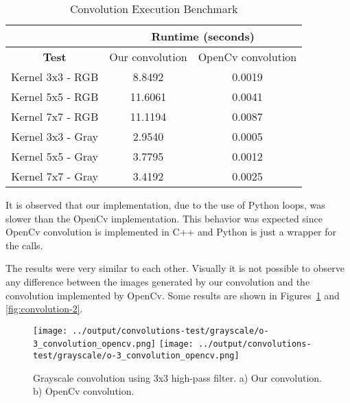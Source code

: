 \documentclass[]{IEEEtran}
\begin{document}
\begin{table}[h!]
\begin{tabular}{|c|c|c|}
\hline
\textbf{}         & \multicolumn{2}{c|}{\textbf{Runtime (seconds)}}                                \\ \hline
\textbf{Test}     & \multicolumn{1}{l|}{Our convolution} & \multicolumn{1}{l|}{OpenCv convolution} \\ \hline
Kernel 3x3 - RGB  & 8.8492                               & 0.0019                                  \\ \hline
Kernel 5x5 - RGB  & 11.6061                              & 0.0041                                  \\ \hline
Kernel 7x7 - RGB  & 11.1194                              & 0.0087                                  \\ \hline
Kernel 3x3 - Gray & 2.9540                               & 0.0005                                  \\ \hline
Kernel 5x5 - Gray & 3.7795                               & 0.0012                                  \\ \hline
Kernel 7x7 - Gray & 3.4192                               & 0.0025                                  \\ \hline
\end{tabular}
\caption{Convolution Execution Benchmark}
\label{table-convolution}
\end{table}

It is observed that our implementation, due to the use of Python loops, was slower than the OpenCv implementation. This behavior was expected since OpenCv convolution is implemented in C++ and Python is just a wrapper for the calls.

The results were very similar to each other. Visually it is not possible to observe any difference between the images generated by our convolution and the convolution implemented by OpenCv. Some results are shown in Figures~\ref{fig:convolution-1} and \ref{fig:convolution-2}.

\begin{figure}[H]
    \centering
    \texttt{[image: ../output/convolutions-test/grayscale/o-3\_convolution\_opencv.png]}
    \texttt{[image: ../output/convolutions-test/grayscale/o-3\_convolution\_opencv.png]}
    \caption{Grayscale convolution using 3x3 high-pass filter. a) Our convolution. b) OpenCv convolution.}
    \label{fig:convolution-1}
\end{figure}
\end{document}
